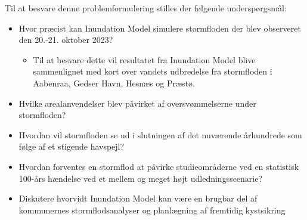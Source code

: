 Til at besvare denne problemformulering stilles der følgende underspørgsmål:
\begin{itemize}
    \item Hvor præcist kan Inundation Model simulere stormfloden der blev observeret den 20.-21. oktober 2023?
    \begin{itemize}
        \item Til at besvare dette vil resultatet fra Inundation Model blive sammenlignet med kort over vandets udbredelse fra stormfloden i Aabenraa, Gedser Havn, Hesnæs og Præstø.
    \end{itemize}
    \item Hvilke arealanvendelser blev påvirket af oversvømmelserne under stormfloden?
    \item Hvordan vil stormfloden se ud i slutningen af det nuværende århundrede som følge af et stigende havspejl?
    \item Hvordan forventes en stormflod at påvirke studieområderne ved en statistisk 100-års hændelse ved et mellem og meget højt udledningsscenarie?
    \item Diskutere hvorvidt Inundation Model kan være en brugbar del af kommunernes stormflodsanalyser og planlægning af fremtidig kystsikring
\end{itemize}